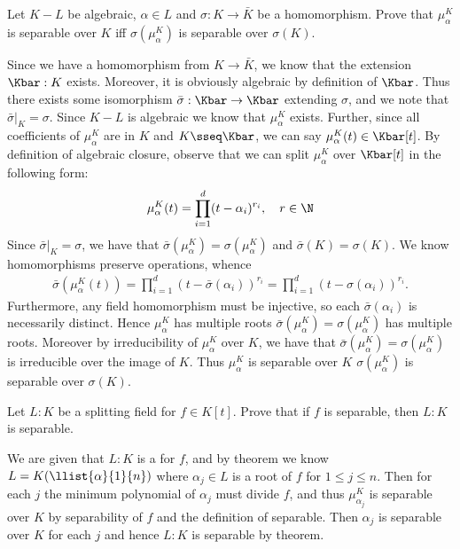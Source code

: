 \documentclass{article}
\begin{document}
\begin{subexercise}
  Let $ K-L $ be algebraic, $ \alpha\in L $ and $ \sigma:K\to \bar K $ be a homomorphism.
  Prove that $ \mu_\alpha^K $ is separable over $ K $ iff $ \sigma(\mu_\alpha^K) $ is separable over $ \sigma(K) $.
\end{subexercise}
\begin{solution}
  Since we have a homomorphism from $ K\to \bar K $, we know that the extension $ \Kbar:K $ exists.
  Moreover, it is obviously algebraic by definition of $ \Kbar $.
  Thus there exists some isomorphism $ \bar\sigma:\Kbar\to\Kbar $ extending $ \sigma $, and we note that $ \bar\sigma|_{K} = \sigma $.
  Since $ K-L $ is algebraic we know that $ \mu_\alpha^K $ exists.
  Further, since all coefficients of $ \mu_\alpha^K $ are in $ K $ and $ K \sseq \Kbar $, we can say $ \mu_\alpha^K(t)\in \Kbar[t] $.
  By definition of algebraic closure, observe that we can split $ \mu_\alpha^K $ over $ \Kbar[t] $ in the following form: \begin{align*}
    \mu_\alpha^K(t) = \prod_{i=1}^{d}(t-\alpha_i)^{r_i},\quad r\in \N
  \end{align*}
  Since $ \bar\sigma|_{K} = \sigma $, we have that $ \bar\sigma(\mu_\alpha^K) = \sigma(\mu_\alpha^K) $ and $ \bar\sigma(K) = \sigma(K) $.
  We know homomorphisms preserve operations, whence
  \begin{align*}
    \bar\sigma\left(\mu_\alpha^K(t)\right) = \prod_{i=1}^{d}(t-\bar\sigma(\alpha_i))^{r_i} = \prod_{i=1}^{d}(t-\sigma(\alpha_i))^{r_i}.
  \end{align*}
  Furthermore, any field homomorphism must be injective, so each $ \bar\sigma(\alpha_i) $ is necessarily distinct.
  Hence $ \mu_\alpha^K $ has multiple roots \iff $ \bar\sigma(\mu_\alpha^K)=\sigma(\mu_\alpha^K) $ has multiple roots.
  Moreover by irreducibility of $ \mu_\alpha^K $ over $ K $, we have that $ \bar\sigma(\mu_\alpha^K) = \sigma(\mu_\alpha^K) $ is irreducible over the image of $ K $.
  Thus $ \mu_\alpha^K $ is separable over $ K $ \iff $ \sigma(\mu_\alpha^K) $ is separable over $ \sigma(K) $.
\end{solution}

\begin{subexercise} \label{ex:sfe1}
  Let $ L:K $ be a splitting field for $ f\in K[t] $.
  Prove that if $ f $ is separable, then $ L:K $ is separable.
\end{subexercise}
\begin{solution}
  We are given that $ L:K $ is a \sfe for $ f $, and by theorem we know $ L=K(\llist{\alpha}{1}{n}) $ where $ \alpha_j\in L $ is a root of $ f $ for $ 1\leq j\leq n $.
  Then for each $ j $ the minimum polynomial of $ \alpha_j $ must divide $ f $, and thus $ \mu_{\alpha_j}^K $ is separable over $ K $ by separability of $ f $ and the definition of separable.
  Then $ \alpha_j $ is separable over $ K $ for each $ j $ and hence $ L:K $ is separable by theorem.
\end{solution}
\end{document}

